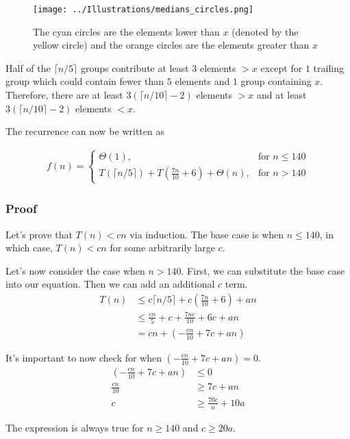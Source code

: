 \documentclass[12pt]{article}
\newcommand\ceil[1]{\lceil#1\rceil}
\begin{document}
\begin{figure}[h]
	\texttt{[image: ../Illustrations/medians\_circles.png]}
	\centering
	\caption{The cyan circles are the elements lower than $x$ (denoted by the yellow circle) and the orange circles are the elements greater than $x$}
\end{figure}

\par{Half of the $\ceil{n / 5}$ groups contribute at least 3 elements $> x$ except for $1$ trailing group which could contain fewer than $5$ elements and $1$ group containing $x$. Therefore, there are at least $3(\ceil{n / 10} - 2)$ elements $> x$ and at least $3(\ceil{n / 10} - 2)$ elements $< x$.}
\par{The recurrence can now be written as}

\begin{align*}
f(n) = 
\begin{cases} 
	\Theta(1), & \mbox{for } n \leq 140 \\
	T(\ceil{n / 5}) + T(\frac{7n}{10} + 6) + \Theta(n), & \mbox{for } n > 140
\end{cases}
\end{align*}

\subsubsection*{Proof}
\par{Let's prove that $T(n) < cn$ via induction. The base case is when $n \leq 140$, in which case, $T(n) < cn$ for some arbitrarily large $c$.}
\par{Let's now consider the case when $n > 140$. First, we can substitute the base case into our equation. Then we can add an additional $c$ term.}
\begin{align*}
T(n) &\leq c\ceil{n / 5} + c(\frac{7n}{10} + 6) + an \\
&\leq \frac{cn}{5} + c + \frac{7nc}{10} + 6c + an \\
&= cn + (-\frac{cn}{10} + 7c + an)
\end{align*}
\par{It's important to now check for when $(-\frac{cn}{10} + 7c + an) = 0$.}
\begin{align*}
(-\frac{cn}{10} + 7c + an) &\leq 0 \\
\frac{cn}{10} &\geq 7c + an \\
c &\geq \frac{70c}{n} + 10a
\end{align*}
\par{The expression is always true for $n \geq 140$ and $c \geq 20a$.}
\end{document}
